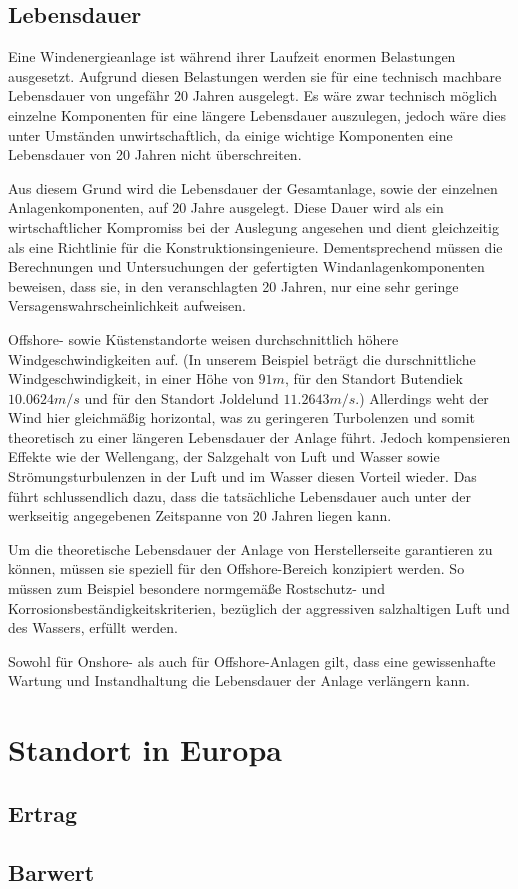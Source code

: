 \documentclass[a4paper,12pt]{article}
\begin{document}
	\subsection{Lebensdauer}
	Eine Windenergieanlage ist während ihrer Laufzeit enormen Belastungen ausgesetzt. Aufgrund diesen Belastungen werden sie für eine technisch machbare Lebensdauer von ungefähr 20 Jahren ausgelegt.\newline
	Es wäre zwar technisch möglich einzelne Komponenten für eine längere Lebensdauer auszulegen, jedoch wäre dies unter Umständen unwirtschaftlich, da einige wichtige Komponenten eine Lebensdauer von 20 Jahren nicht überschreiten.\\ \par
	\noindent Aus diesem Grund wird die Lebensdauer der Gesamtanlage, sowie der einzelnen Anlagenkomponenten, auf 20 Jahre ausgelegt. Diese Dauer wird als ein wirtschaftlicher Kompromiss bei der Auslegung angesehen und dient gleichzeitig als eine Richtlinie für die Konstruktionsingenieure. Dementsprechend müssen die Berechnungen und Untersuchungen der gefertigten Windanlagenkomponenten beweisen, dass sie, in den veranschlagten 20 Jahren, nur eine sehr geringe Versagenswahrscheinlichkeit aufweisen.\\ \par
	\noindent Offshore- sowie Küstenstandorte weisen durchschnittlich höhere Windgeschwindigkeiten auf. (In unserem Beispiel beträgt die durschnittliche Windgeschwindigkeit, in einer Höhe von $91m$, für den Standort Butendiek $10.0624m/s$ und für den Standort Joldelund $11.2643m/s$.) Allerdings weht der Wind hier gleichmäßig horizontal, was zu geringeren Turbolenzen und somit theoretisch zu einer längeren Lebensdauer der Anlage führt. Jedoch kompensieren Effekte wie der Wellengang, der Salzgehalt von Luft und Wasser sowie Strömungsturbulenzen in der Luft und im Wasser diesen Vorteil wieder. Das führt schlussendlich dazu, dass die tatsächliche Lebensdauer auch unter der werkseitig angegebenen Zeitspanne von 20 Jahren liegen kann.\\ \par
	\noindent Um die theoretische Lebensdauer der Anlage von Herstellerseite garantieren zu können, müssen sie speziell für den Offshore-Bereich konzipiert werden. So müssen zum Beispiel besondere normgemäße Rostschutz- und Korrosionsbeständigkeitskriterien, bezüglich der aggressiven salzhaltigen Luft und des Wassers, erfüllt werden.\\ \par
	\noindent Sowohl für Onshore- als auch für Offshore-Anlagen gilt, dass eine gewissenhafte Wartung und Instandhaltung die Lebensdauer der Anlage verlängern kann.
	\newpage
	\section{Standort in Europa}
	\subsection{Ertrag}
	\subsection{Barwert}
	\newpage
	\listoffigures
	
\end{document}
